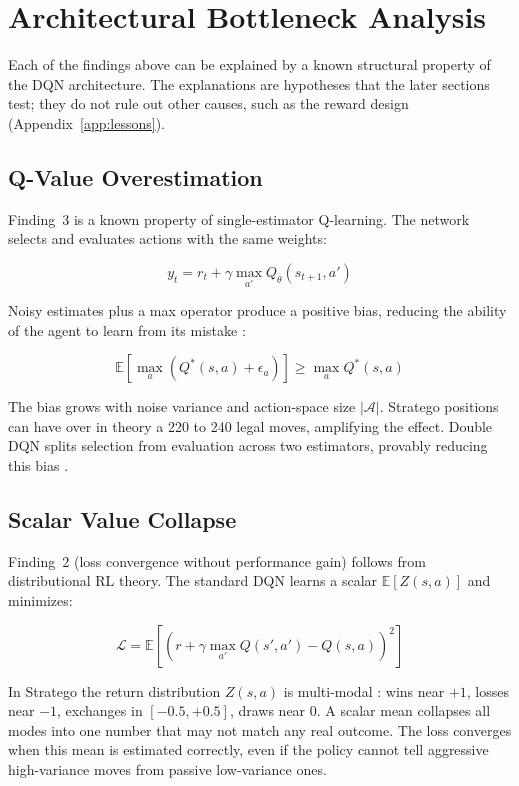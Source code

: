 \section{Architectural Bottleneck Analysis}

Each of the findings above can be explained by a known structural property of the DQN architecture. The explanations are hypotheses that the later sections test; they do not rule out other causes, such as the reward design (Appendix~\ref{app:lessons}).

\subsection{Q-Value Overestimation}

Finding~3 is a known property of single-estimator Q-learning. The network selects and evaluates actions with the same weights:

\begin{equation}
y_t = r_t + \gamma \max_{a'} Q_\theta(s_{t+1}, a')
\end{equation}

Noisy estimates plus a max operator produce a positive bias, reducing the ability of the agent to learn from its mistake \cite{RainbowJMLR2021}:

\begin{equation}
\mathbb{E}\left[\max_{a} (Q^*(s, a) + \epsilon_a)\right] \geq \max_{a} Q^*(s, a)
\end{equation}

The bias grows with noise variance and action-space size $|\mathcal{A}|$. Stratego positions can have over in theory a 220 to 240 legal moves, amplifying the effect. Double DQN splits selection from evaluation across two estimators, provably reducing this bias \cite{RainbowJMLR2021}.

\subsection{Scalar Value Collapse}

Finding~2 (loss convergence without performance gain) follows from distributional RL theory. The standard DQN learns a scalar $\mathbb{E}[Z(s,a)]$ and minimizes:

\begin{equation}
\mathcal{L} = \mathbb{E}\left[\left(r + \gamma \max_{a'} Q(s', a') - Q(s, a)\right)^2\right]
\end{equation}

In Stratego the return distribution $Z(s,a)$ is multi-modal \cite{RainbowJMLR2021}: wins near $+1$, losses near $-1$, exchanges in $[-0.5, +0.5]$, draws near $0$. A scalar mean collapses all modes into one number that may not match any real outcome. The loss converges when this mean is estimated correctly, even if the policy cannot tell aggressive high-variance moves from passive low-variance ones.


